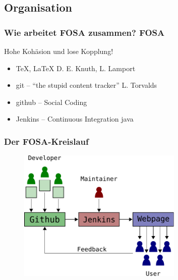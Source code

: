\subsection{Organisation}
\begin{frame}
	\frametitle{Wie arbeitet FOSA zusammen? 
		\hfill{} \footnotesize{FOSA}}
	\begin{block}{Hohe Kohäsion und lose Kopplung!}
		\begin{itemize}
			\item \TeX, \LaTeX 
				\hfill{} 
				\footnotesize{D. E. Knuth, L. Lamport} 
				\normalsize
			\item git -- "`the stupid content tracker"'
				\hfill{}
				\footnotesize{L. Torvalds}
				\normalsize
			\item github -- Social Coding
			\item Jenkins -- Continuous Integration
				\hfill{}
				\footnotesize{java}
				\normalsize
		\end{itemize}
	\end{block}
\end{frame}

\begin{frame}
	\frametitle{Der FOSA-Kreislauf}
	\begin{figure}
		\centering
		\includegraphics[width=0.7\textwidth]{fosa-loop.pdf}

	\end{figure}
\end{frame}

